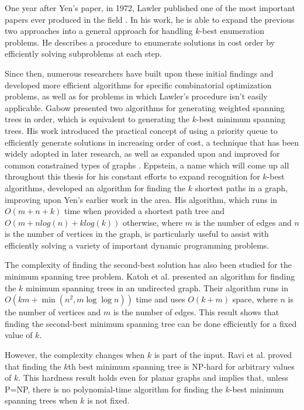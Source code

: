 One year after Yen's paper, in 1972, Lawler published one of the most important papers ever produced in the field \cite{lawler1972procedure}. In his work, he is able to expand the previous two approaches into a general approach for handling $k$-best enumeration problems. He describes a procedure to enumerate solutions in cost order by efficiently solving subproblems at each step.

Since then, numerous researchers have built upon these initial findings and developed more efficient algorithms for specific combinatorial optimization problems, as well as for problems in which Lawler's procedure isn't easily applicable. Gabow \cite{gabow1977finding} presented two algorithms for generating weighted spanning trees in order, which is equivalent to generating the $k$-best minimum spanning trees. His work introduced the practical concept of using a priority queue to efficiently generate solutions in increasing order of cost, a technique that has been widely adopted in later research, as well as expanded upon and improved for common constrained types of graphs \cite{katoh1981efficient, frederickson1993ambivalent}. Eppstein, a name which will come up all throughout this thesis for his constant efforts to expand recognition for $k$-best algorithms, \cite{eppstein1997finding} developed an algorithm for finding the $k$ shortest paths in a graph, improving upon Yen's earlier work in the area. His algorithm, which runs in $O(m + n + k)$ time when provided a shortest path tree and $O(m + nlog(n) + klog(k))$ otherwise, where $m$ is the number of edges and $n$ is the number of vertices in the graph, is particularly useful to assist with efficiently solving a variety of important dynamic programming problems.

The complexity of finding the second-best solution has also been studied for the minimum spanning tree problem. Katoh et al. \cite{doi:10.1137/0210017} presented an algorithm for finding the $k$ minimum spanning trees in an undirected graph. Their algorithm runs in $O(km + \min(n^2, m\log \log n))$ time and uses $O(k + m)$ space, where $n$ is the number of vertices and $m$ is the number of edges. This result shows that finding the second-best minimum spanning tree can be done efficiently for a fixed value of $k$.

However, the complexity changes when $k$ is part of the input. Ravi et al. \cite{ravi1996spanning} proved that finding the $k$th best minimum spanning tree is NP-hard for arbitrary values of $k$. This hardness result holds even for planar graphs and implies that, unless P=NP, there is no polynomial-time algorithm for finding the $k$-best minimum spanning trees when $k$ is not fixed.

